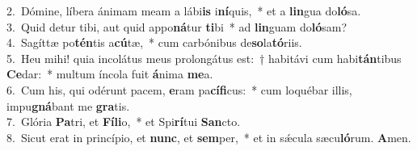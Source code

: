 {2.~}Dómine, líbera ánimam meam a lábi\textbf{is} i\textbf{ní}quis,~* et a \textbf{lin}gua do\textbf{ló}sa.\\
{3.~}Quid detur tibi, aut quid appo\textbf{ná}tur \textbf{ti}bi~* ad \textbf{lin}guam do\textbf{ló}sam?\\
{4.~}Sagíttæ po\textbf{tén}tis a\textbf{cú}tæ,~* cum carbónibus de\textbf{so}la\textbf{tó}riis.\\
{5.~}Heu mihi! quia incolátus meus prolongátus est:~† habitávi cum habi\textbf{tán}tibus \textbf{Ce}dar:~* multum íncola fuit \textbf{á}nima \textbf{me}a.\\
{6.~}Cum his, qui odérunt pacem, \textbf{e}ram pa\textbf{cí}\textbf{fi}cus:~* cum loquébar illis, impu\textbf{gná}bant me \textbf{gra}tis.\\
{7.~}Glória \textbf{Pa}tri, et \textbf{Fí}\textbf{li}o,~* et Spi\textbf{rí}tui \textbf{San}cto.\\
{8.~}Sicut erat in princípio, et \textbf{nunc}, et \textbf{sem}per,~* et in sǽcula sæcu\textbf{ló}rum. \textbf{A}men.\\
